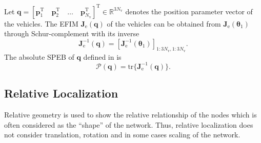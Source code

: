 \documentclass{IEEEtran}
\begin{document}
Let $\mathbf{q}=[\mathbf{p}_1^{\text{T}}\quad \mathbf{p}_2^{\text{T}}\quad \dots \quad\mathbf{p}_{N_{\text{v}}}^{\text{T}} ]^{\text{T}}\in \mathbb{R}^{3N_{\text{v}}}$ denotes the position parameter vector of the vehicles. The EFIM $\mathbf{J}_{\text{e}}(\mathbf{q})$ of the vehicles can be obtained from $\mathbf{J}_{\text{e}}(\boldsymbol{\theta}_1)$ through Schur-complement with its inverse
\begin{equation}
\mathbf{J}_{\text{e}}^{-1}(\mathbf{q})=[\mathbf{J}_{\text{e}}^{-1}(\boldsymbol{\theta}_1)]_{1:3N_{\text{v}}, 1:3N_{\text{v}}}.
\end{equation}
The absolute SPEB of $\mathbf{q}$ defined in \cite{SheWymWin:J10} is
\begin{equation}\label{eq09}
\mathcal{P}(\mathbf{q})=\text{tr}\{\mathbf{J}_{\text{e}}^{-1}(\mathbf{q})\}.
\end{equation}

\subsection{Relative Localization}
Relative geometry is used to show the relative relationship of the nodes which is often considered as the ``shape'' of the network.
Thus, relative localization does not consider translation, rotation and in some cases scaling of the network.
\end{document}
